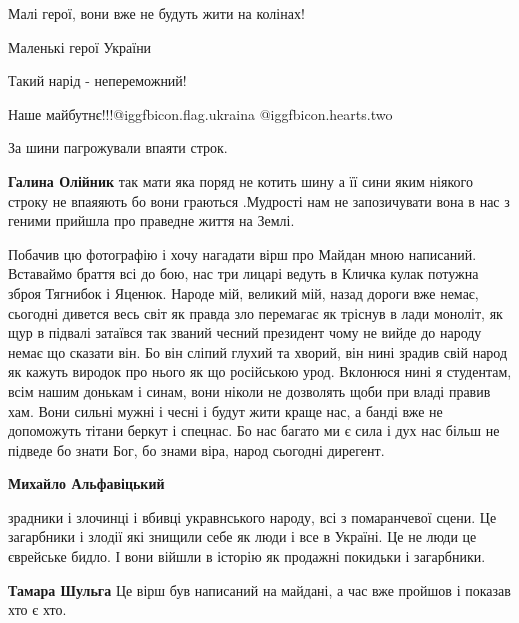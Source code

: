  
 
 
 
 

Малі герої, вони вже не будуть жити на колінах!

Маленькі герої України

Такий нарід - непереможний!

Наше майбутнє!!!@igg{fbicon.flag.ukraina} @igg{fbicon.hearts.two} 

За шини пагрожували впаяти строк.

\begin{itemize} %
\textbf{Галина Олійник} так мати яка поряд не котить шину а її сини яким ніякого строку не впаяяють бо вони граються .Мудрості нам не запозичувати вона в нас з геними прийшла про праведне життя на Землі.
\end{itemize} %


Побачив цю фотографію і хочу нагадати вірш про Майдан мною написаний. Вставаймо
браття всі до бою, нас три лицарі ведуть в Кличка кулак потужна зброя Тягнибок
і Яценюк. Народе мій, великий мій, назад дороги вже немає, сьогодні дивется
весь світ як правда зло перемагає як тріснув в лади моноліт, як щур в підвалі
затаївся так званий чесний президент чому не вийде до народу немає що сказати
він. Бо він сліпий глухий та хворий, він нині зрадив свій народ як кажуть
виродок про нього як що російською урод. Вклонюся нині я студентам, всім нашим
донькам і синам, вони ніколи не дозволять щоби при владі правив хам. Вони сильні
мужні і чесні і будут жити краще нас, а банді вже не допоможуть тітани беркут і
спецнас. Бо нас багато ми є сила і дух нас більш не підведе бо знати Бог, бо
знами віра, народ сьогодні дирегент.

\begin{itemize} %
\textbf{Михайло Альфавіцький} 

зрадники і злочинці і вбивці укравнського народу, всі з помаранчевої сцени. Це
загарбники і злодії які знищили себе як люди і все в Україні. Це не люди це
єврейське бидло. І вони війшли в історію як продажні покидьки і загарбники.

\textbf{Тамара Шульга} Це вірш був написаний на майдані, а час вже пройшов і показав хто є хто.
\end{itemize} %

